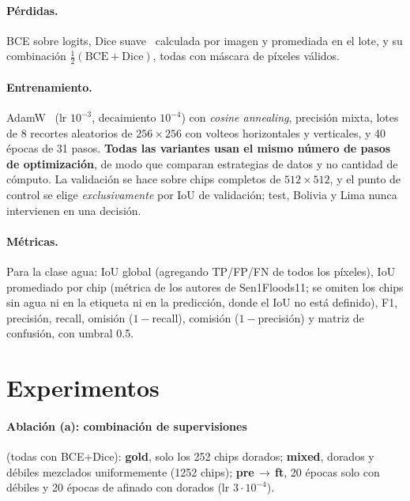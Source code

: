 \documentclass{article}
\begin{document}
\paragraph{Pérdidas.} BCE sobre logits, Dice suave~\cite{milletari2016vnet} calculada por imagen y
promediada en el lote, y su combinación $\tfrac12(\text{BCE}+\text{Dice})$, todas con máscara de
píxeles válidos.

\paragraph{Entrenamiento.} AdamW~\cite{loshchilov2019adamw} (lr $10^{-3}$, decaimiento $10^{-4}$) con
\emph{cosine annealing}, precisión mixta, lotes de 8 recortes aleatorios de $256\times256$ con volteos
horizontales y verticales, y 40 épocas de 31 pasos. \textbf{Todas las variantes usan el mismo número de
pasos de optimización}, de modo que comparan estrategias de datos y no cantidad de cómputo. La
validación se hace sobre chips completos de $512\times512$, y el punto de control se elige
\emph{exclusivamente} por IoU de validación; test, Bolivia y Lima nunca intervienen en una decisión.

\paragraph{Métricas.} Para la clase agua: IoU global (agregando TP/FP/FN de todos los píxeles), IoU
promediado por chip (métrica de los autores de Sen1Floods11; se omiten los chips sin agua ni en la etiqueta
ni en la predicción, donde el IoU no está definido), F1, precisión, recall, omisión
($1-$recall), comisión ($1-$precisión) y matriz de confusión, con umbral 0.5.

\section{Experimentos}

\paragraph{Ablación (a): combinación de supervisiones} (todas con BCE+Dice):
\textbf{gold}, solo los 252 chips dorados;
\textbf{mixed}, dorados y débiles mezclados uniformemente (1252 chips);
\textbf{pre\,$\to$\,ft}, 20 épocas solo con débiles y 20 épocas de afinado con dorados (lr $3\cdot10^{-4}$).
\end{document}

